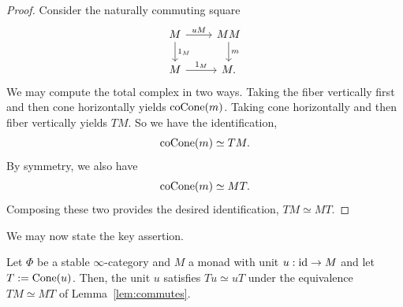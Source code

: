 \begin{proof}
    Consider the naturally commuting square
    \[\begin{tikzcd}
        M & MM \\
        M & M.
        \arrow["uM", from=1-1, to=1-2]
        \arrow["{1_M}", from=1-1, to=2-1]
        \arrow["m", from=1-2, to=2-2]
        \arrow["{1_M}", from=2-1, to=2-2]
    \end{tikzcd}\]
    We may compute the total complex in two ways. Taking the fiber vertically first and then cone horizontally yields $\operatorname{coCone}(m)$. Taking cone horizontally and then fiber vertically yields $TM$. So we have the identification,
    \[\operatorname{coCone}(m)\simeq TM.\]
    By symmetry, we also have
    \[\operatorname{coCone}(m)\simeq MT.\]
    Composing these two provides the desired identification, $TM\simeq MT$.
\end{proof}

We may now state the key assertion.

\begin{prop}\label{prop:main}
    Let $\Phi$ be a stable $\infty$-category and $M$ a monad with unit $u:\operatorname{id}\to M$ and let $T:=\operatorname{Cone}(u)$. Then, the unit $u$ satisfies $Tu\simeq uT$ under the equivalence $TM\simeq MT$ of Lemma~\ref{lem:commutes}.
\end{prop}

